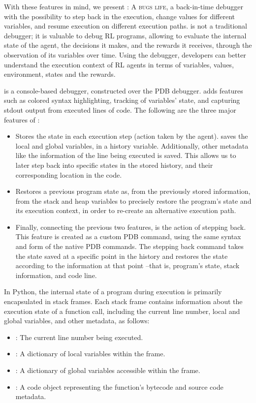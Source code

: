With these features in mind, we present \flik: \textsc{A bugs life}, a back-in-time debugger with the 
possibility to step back in the execution, change values for different variables, and resume execution 
on different execution paths. \flik is not a traditional debugger; it is valuable to debug \ac{RL} 
programs, allowing to evaluate the internal state of the agent, the decisions it makes, and the rewards 
it receives, through the observation of its variables over time. Using the debugger, developers can 
better understand the execution context of \ac{RL} agents in terms of variables, values, environment, 
states and the rewards. 

\flik is a console-based debugger, constructed over the \ac{PDB} debugger. \flik adds features 
such as colored syntax highlighting, tracking of variables' state, and capturing stdout output 
from executed lines of code. The following are the three major features of \flik:
\begin{itemize}
    \item Stores the state in each execution step (\ie action taken by the agent). \flik saves the local 
    and global variables, in a history variable. Additionally, other metadata like the information of the 
    line being executed is saved. This allows us to later step back into specific states in the stored 
    history, and their corresponding location in the code. 
    \item Restores a previous program state as, from the previously stored information, from the 
    stack and heap variables to precisely restore the program's state and its execution context, in 
    order to re-create an alternative execution path. 
    \item Finally, connecting the previous two features, is the action of stepping back. This feature is 
    created as a custom \ac{PDB} command, using the same syntax and form of the native \ac{PDB} 
    commands. The stepping back command takes the state saved at a specific point in the history 
    and restores the state according to the information at that point --that is, program's state, stack 
    information, and code line. 
\end{itemize}

In Python, the internal state of a program during execution is primarily encapsulated in 
stack frames. Each stack frame contains information about the execution state of a function 
call, including the current line number, local and global variables, and other metadata, as follows:
\begin{itemize}
    \item {}: The current line number being executed.
    \item {}: A dictionary of local variables within the frame.
    \item {}: A dictionary of global variables accessible within the frame.
    \item {}: A code object representing the function's bytecode and source code metadata.
\end{itemize}

